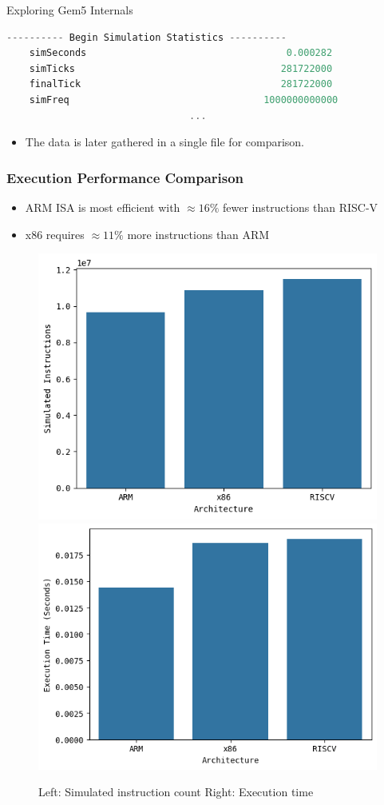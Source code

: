 \begin{frame}[fragile]{Exploring Gem5 Internals}

	\begin{lstlisting}[language=C++, caption={Sample \texttt{stats.txt}}]
    ---------- Begin Simulation Statistics ----------
    simSeconds                                   0.000282                       # Number of seconds simulated (Second)
    simTicks                                    281722000                       # Number of ticks simulated (Tick)
    finalTick                                   281722000                       # Number of ticks from beginning of simulation (restored from checkpoints and never reset) (Tick)
    simFreq                                  1000000000000                       # The number of ticks per simulated second ((Tick/Second))
                                ...
  \end{lstlisting}
	\begin{itemize}
		\item The data is later gathered in a single file for comparison.
	\end{itemize}
\end{frame}

\begin{frame}
	\frametitle{Execution Performance Comparison}
	\begin{itemize}
		\item ARM ISA is most efficient with $\approx 16\%$ fewer instructions than RISC-V
		\item x86 requires $\approx 11\%$ more instructions than ARM
	\end{itemize}

	\begin{figure}[h]
		\centering
		\includegraphics[width=0.4\linewidth]{images/inst_count.png}
		\includegraphics[width=0.4\linewidth]{images/exec.png}
		\caption{Left: Simulated instruction count \quad Right: Execution time}
	\end{figure}
\end{frame}


